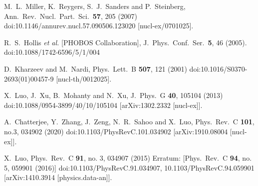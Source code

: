 \begin{thebibliography}{99}
 

 
  M.~L.~Miller, K.~Reygers, S.~J.~Sanders and P.~Steinberg,
  Ann.\ Rev.\ Nucl.\ Part.\ Sci.\  {\bf 57}, 205 (2007)
  doi:10.1146/annurev.nucl.57.090506.123020
  [nucl-ex/0701025].
  
  R.~S.~Hollis {\it et al.} [PHOBOS Collaboration],
  J.\ Phys.\ Conf.\ Ser.\  {\bf 5}, 46 (2005).
  doi:10.1088/1742-6596/5/1/004
 
 
  D.~Kharzeev and M.~Nardi,
  Phys.\ Lett.\ B {\bf 507}, 121 (2001)
  doi:10.1016/S0370-2693(01)00457-9
  [nucl-th/0012025].
   
   
 

X.~Luo, J.~Xu, B.~Mohanty and N.~Xu,
J.\ Phys.\ G \textbf{40}, 105104 (2013)
doi:10.1088/0954-3899/40/10/105104
[arXiv:1302.2332 [nucl-ex]].

A.~Chatterjee, Y.~Zhang, J.~Zeng, N.~R.~Sahoo and X.~Luo,
Phys.\ Rev.\ C \textbf{101}, no.3, 034902 (2020)
doi:10.1103/PhysRevC.101.034902
[arXiv:1910.08004 [nucl-ex]].


  X.~Luo,
  Phys.\ Rev.\ C {\bf 91}, no. 3, 034907 (2015)
  Erratum: [Phys.\ Rev.\ C {\bf 94}, no. 5, 059901 (2016)]
  doi:10.1103/PhysRevC.91.034907, 10.1103/PhysRevC.94.059901
  [arXiv:1410.3914 [physics.data-an]].
  

\end{thebibliography}
